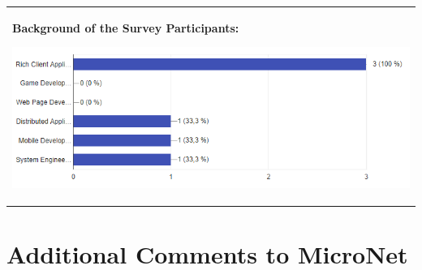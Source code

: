 \begin{center}
	\hspace*{-1.9cm}
  	\begin{tabular}{ p{17.4cm} }
  	\textbf{Background of the Survey Participants:}
  	
  	\includegraphics[width=\linewidth]{images/survey/experience}
    \\
  	
  	\end{tabular}
\end{center}

\section*{Additional Comments to MicroNet}

